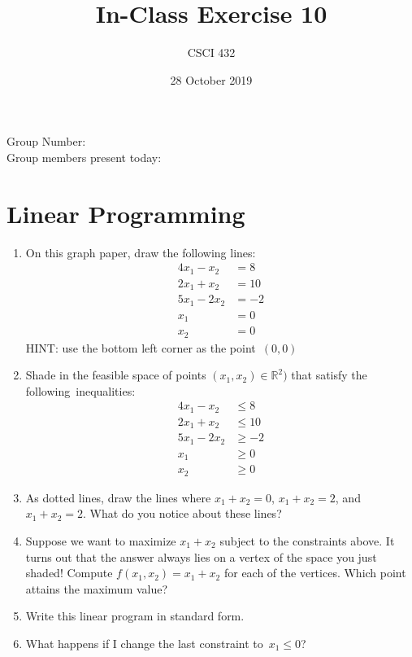 \documentclass{article}
\title{In-Class Exercise 10}
\author{CSCI 432}
\date{28 October 2019}
\def\R{{\mathbb R}}
\begin{document}
\maketitle

\noindent
Group Number:\\
Group members present today:

\section*{Linear Programming}

\begin{multicols}{2}

\begin{enumerate}
\item On this graph paper, draw the following lines:
\begin{align}
4x_1 - x_2 &= 8\\
2x_1 + x_2 &= 10\\
5x_1 -2x_2 &= -2 \\
x_1 &= 0\\
x_2 &= 0
\end{align}
HINT: use the bottom
left corner as the point~$(0,0)$
\item Shade in the feasible space of points $(x_1,x_2)\in \R^2)$ that
satisfy the following~inequalities:
\begin{align}
4x_1 - x_2 &\leq 8\\
2x_1 + x_2 &\leq 10\\
5x_1 -2x_2 &\geq -2 \\
x_1 &\geq 0\\
x_2 &\geq 0
\end{align}
\item As dotted lines, draw the lines where $x_1+x_2=0$, $x_1+x_2=2$, and
$x_1+x_2=2$.  What do you notice about these lines?
\vspace{.75in}
\item Suppose we want to maximize $x_1+x_2$ subject to the constraints
above.  It turns out that the answer always lies on a vertex of the
space you just shaded!  Compute $f(x_1,x_2)=x_1+x_2$ for each of the
vertices. Which point attains the maximum value?
\vspace{.75in}
\item Write this linear program in standard form.\\
\vspace{2in}
\item What happens if I change the last constraint to~$x_1 \leq 0$?
\end{enumerate}

\end{multicols}
\end{document}

